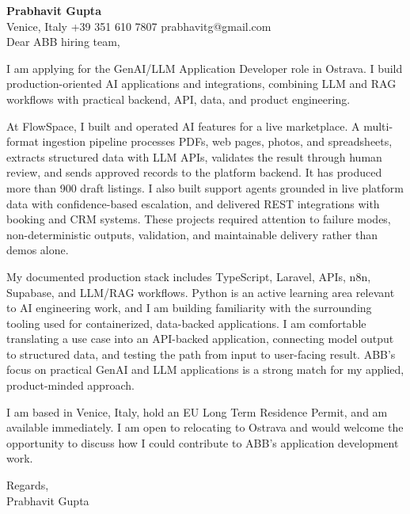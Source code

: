 \documentclass[a4paper,10.5pt]{article}
\begin{document}
\textbf{Prabhavit Gupta}\\
Venice, Italy \textbar{} +39 351 610 7807 \textbar{} prabhavitg@gmail.com\\[10pt]
Dear ABB hiring team,

I am applying for the GenAI/LLM Application Developer role in Ostrava. I build production-oriented AI applications and integrations, combining LLM and RAG workflows with practical backend, API, data, and product engineering.

At FlowSpace, I built and operated AI features for a live marketplace. A multi-format ingestion pipeline processes PDFs, web pages, photos, and spreadsheets, extracts structured data with LLM APIs, validates the result through human review, and sends approved records to the platform backend. It has produced more than 900 draft listings. I also built support agents grounded in live platform data with confidence-based escalation, and delivered REST integrations with booking and CRM systems. These projects required attention to failure modes, non-deterministic outputs, validation, and maintainable delivery rather than demos alone.

My documented production stack includes TypeScript, Laravel, APIs, n8n, Supabase, and LLM/RAG workflows. Python is an active learning area relevant to AI engineering work, and I am building familiarity with the surrounding tooling used for containerized, data-backed applications. I am comfortable translating a use case into an API-backed application, connecting model output to structured data, and testing the path from input to user-facing result. ABB's focus on practical GenAI and LLM applications is a strong match for my applied, product-minded approach.

I am based in Venice, Italy, hold an EU Long Term Residence Permit, and am available immediately. I am open to relocating to Ostrava and would welcome the opportunity to discuss how I could contribute to ABB's application development work.

Regards,\\
Prabhavit Gupta
\end{document}
